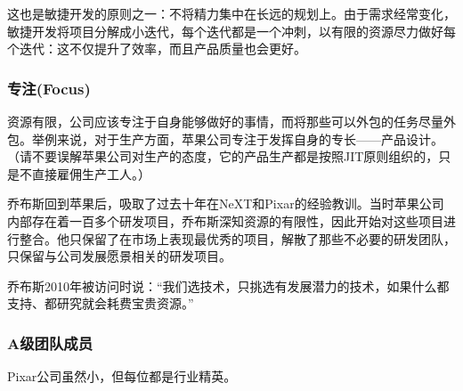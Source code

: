 这也是敏捷开发的原则之一：不将精力集中在长远的规划上。由于需求经常变化，敏捷开发将项目分解成小迭代，每个迭代都是一个冲刺，以有限的资源尽力做好每个迭代：这不仅提升了效率，而且产品质量也会更好。

\hypertarget{ux4e13ux6ce8focus}{%
\subsubsection{专注(Focus)}\label{ux4e13ux6ce8focus}}

资源有限，公司应该专注于自身能够做好的事情，而将那些可以外包的任务尽量外包。举例来说，对于生产方面，苹果公司专注于发挥自身的专长——产品设计。（请不要误解苹果公司对生产的态度，它的产品生产都是按照JIT原则组织的，只是不直接雇佣生产工人。）


乔布斯回到苹果后，吸取了过去十年在NeXT和Pixar的经验教训。当时苹果公司内部存在着一百多个研发项目，乔布斯深知资源的有限性，因此开始对这些项目进行整合。他只保留了在市场上表现最优秀的项目，解散了那些不必要的研发团队，只保留与公司发展愿景相关的研发项目。

乔布斯2010年被访问时说：“我们选技术，只挑选有发展潜力的技术，如果什么都支持、都研究就会耗费宝贵资源。”

\hypertarget{aux7ea7ux56e2ux961fux6210ux5458}{%
\subsubsection{A级团队成员}\label{aux7ea7ux56e2ux961fux6210ux5458}}

Pixar公司虽然小，但每位都是行业精英。


